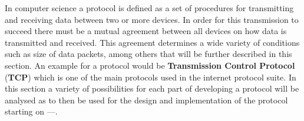 In computer science a protocol is defined as a set of procedures for transmitting and receiving data between two or more devices.
In order for this transmission to succeed there must be a mutual agreement between all devices on how data is transmitted and received.
This agreement determines a wide variety of conditions such as size of data packets, among others that will be further described in this section.
An example for a protocol would be \textbf{Transmission Control Protocol} (\textbf{TCP}) which is one of the main protocols used in the internet protocol suite.
In this section a variety of possibilities for each part of developing a protocol will be analysed as to then be used for the design and implementation of the protocol starting on ---.
